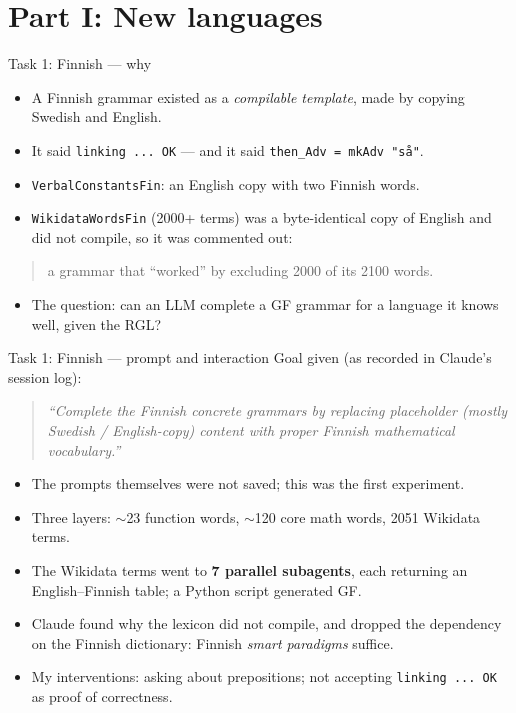 \documentclass[10pt,aspectratio=169]{beamer}
\newcommand{\prompt}[1]{\begin{quote}\small\itshape ``#1''\end{quote}}
\begin{document}
\section{Part I: New languages}

\begin{frame}{Task 1: Finnish --- why}
  \begin{itemize}
    \item A Finnish grammar existed as a \emph{compilable template},
          made by copying Swedish and English.
    \item It said \texttt{linking ... OK} --- and it said
          \texttt{then\_Adv = mkAdv "så"}.
    \item \texttt{VerbalConstantsFin}: an English copy with two Finnish words.
    \item \texttt{WikidataWordsFin} (2000+ terms) was a byte-identical copy
          of English and did not compile, so it was commented out:
  \end{itemize}
  \begin{quote}\small
    a grammar that ``worked'' by excluding 2000 of its 2100 words.
  \end{quote}
  \begin{itemize}
    \item The question: can an LLM complete a GF grammar for a language
          it knows well, given the RGL?
  \end{itemize}
\end{frame}

\begin{frame}{Task 1: Finnish --- prompt and interaction}
  \small Goal given (as recorded in Claude's session log):
  \prompt{Complete the Finnish concrete grammars by replacing placeholder
    (mostly Swedish / English-copy) content with proper Finnish mathematical
    vocabulary.}
  \begin{itemize}
    \item The prompts themselves were not saved; this was the first experiment.
    \item Three layers: $\sim$23 function words, $\sim$120 core math words,
          2051 Wikidata terms.
    \item The Wikidata terms went to \textbf{7 parallel subagents}, each returning
          an English--Finnish table; a Python script generated GF.
    \item Claude found why the lexicon did not compile, and dropped the dependency
          on the Finnish dictionary: Finnish \emph{smart paradigms} suffice.
    \item My interventions: asking about prepositions; not accepting
          \texttt{linking ... OK} as proof of correctness.
  \end{itemize}
\end{frame}
\end{document}
